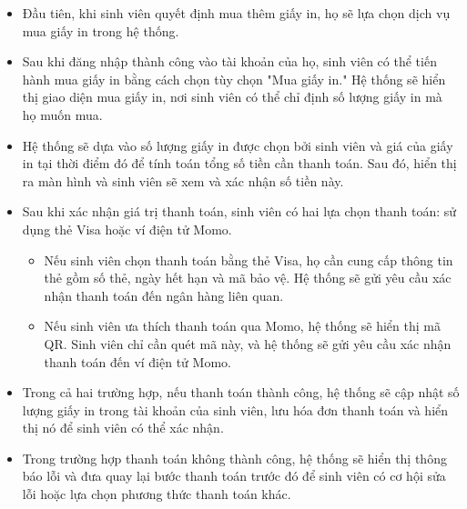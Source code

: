     \begin{itemize}
        \item Đầu tiên, khi sinh viên quyết định mua thêm giấy in, họ sẽ lựa chọn dịch vụ mua giấy in trong hệ thống.
        \item Sau khi đăng nhập thành công vào tài khoản của họ, sinh viên có thể tiến hành mua giấy in bằng cách chọn tùy chọn "Mua giấy in." Hệ thống sẽ hiển thị giao diện mua giấy in, nơi sinh viên có thể chỉ định số lượng giấy in mà họ muốn mua.
        \item Hệ thống sẽ dựa vào số lượng giấy in được chọn bởi sinh viên và giá của giấy in tại thời điểm đó để tính toán tổng số tiền cần thanh toán. Sau đó, hiển thị ra màn hình và sinh viên sẽ xem và xác nhận số tiền này.
        \item Sau khi xác nhận giá trị thanh toán, sinh viên có hai lựa chọn thanh toán: sử dụng thẻ Visa hoặc ví điện tử Momo.
        \begin{itemize}
            \item Nếu sinh viên chọn thanh toán bằng thẻ Visa, họ cần cung cấp thông tin thẻ gồm số thẻ, ngày hết hạn và mã bảo vệ. Hệ thống sẽ gửi yêu cầu xác nhận thanh toán đến ngân hàng liên quan.
            \item Nếu sinh viên ưa thích thanh toán qua Momo, hệ thống sẽ hiển thị mã QR. Sinh viên chỉ cần quét mã này, và hệ thống sẽ gửi yêu cầu xác nhận thanh toán đến ví điện tử Momo.
        \end{itemize}
        \item Trong cả hai trường hợp, nếu thanh toán thành công, hệ thống sẽ cập nhật số lượng giấy in trong tài khoản của sinh viên, lưu hóa đơn thanh toán và hiển thị nó để sinh viên có thể xác nhận.
        \item Trong trường hợp thanh toán không thành công, hệ thống sẽ hiển thị thông báo lỗi và đưa quay lại bước thanh toán trước đó để sinh viên có cơ hội sửa lỗi hoặc lựa chọn phương thức thanh toán khác.
    \end{itemize}


    \newpage
